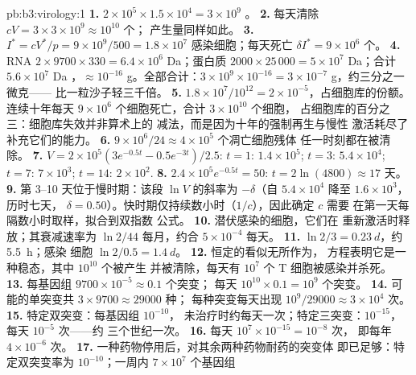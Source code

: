 \begin{solution}{pb:b3:virology:1}
\textbf{1.} $2\times 10^{5}\times 1.5\times 10^{4} = 3\times 10^{9}$
。
\textbf{2.} 每天清除 $cV = 3\times 3\times 10^{9} \approx 10^{10}$ 个；
产生量同样如此。
\textbf{3.} $I^{*} = cV^{*}/p = 9\times 10^{9}/500 = 1.8\times 10^{7}$
感染细胞；每天死亡 $\delta I^{*} = 9\times 10^{6}$ 个。
\textbf{4.} RNA $2\times 9700\times 330 = 6.4\times 10^{6}$ Da；蛋白质
$2000\times 25\,000 = 5\times 10^{7}$ Da；合计 $5.6\times 10^{7}$ Da
，$\approx 10^{-16}$ g。全部合计：$3\times 10^{9}\times
10^{-16} = 3\times 10^{-7}$ g，约三分之一微克——
比一粒沙子轻三千倍。
\textbf{5.} $1.8\times 10^{7}/10^{12} = 2\times 10^{-5}$，占细胞库的份额。
连续十年每天 $9\times 10^{6}$ 个细胞死亡，合计 $3\times 10^{10}$ 个细胞，
占细胞库的百分之三：细胞库失效并非算术上的
减法，而是因为十年的强制再生与慢性
激活耗尽了补充它们的能力。
\textbf{6.} $9\times 10^{6}/24 \approx 4\times 10^{5}$ 个凋亡细胞残体
任一时刻都在被清除。
\textbf{7.} $V = 2\times 10^{5}(3e^{-0.5t} - 0.5e^{-3t})/2.5$: $t = 1$:
$1.4\times 10^{5}$; $t = 3$: $5.4\times 10^{4}$; $t = 7$: $7\times
10^{3}$; $t = 14$: $2\times 10^{2}$.
\textbf{8.} $2.4\times 10^{5}e^{-0.5t} = 50$: $t = 2\ln(4800) \approx 17$
天。
\textbf{9.} 第 3--10 天位于慢时期：该段 $\ln V$ 的斜率为
$-\delta$（自 $5.4\times 10^{4}$ 降至 $1.6\times 10^{3}$，历时七天，
$\delta = 0.50$）。快时期仅持续数小时（$1/c$），因此确定 $c$ 需要
在第一天每隔数小时取样，拟合到双指数
公式。
\textbf{10.} 潜伏感染的细胞，它们在
重新激活时释放；其衰减速率为 $\ln 2/44$ 每月，约合
$5\times 10^{-4}$ 每天。
\textbf{11.}  $\ln 2/3 = \qty{0.23}{d}$，约 \qty{5.5}{h}；感染
细胞 $\ln 2/0.5 = \qty{1.4}{d}$。
\textbf{12.} 恒定的看似无所作为，
方程表明它是一种稳态，其中 $10^{10}$ 个被产生
并被清除，每天有 $10^{7}$ 个 T 细胞被感染并杀死。
\textbf{13.} 每基因组 $9700\times 10^{-5} \approx 0.1$ 个突变；
每天 $10^{10}\times 0.1 = 10^{9}$ 个突变。
\textbf{14.} 可能的单突变共 $3\times 9700 \approx \num{29000}$ 种；
每种突变每天出现 $10^{9}/\num{29000} \approx 3\times 10^{4}$ 次。
\textbf{15.} 特定双突变：每基因组 $10^{-10}$，
未治疗时约每天一次；特定三突变：$10^{-15}$，每天 $10^{-5}$ 次——约
三个世纪一次。
\textbf{16.} 每天 $10^{7}\times 10^{-15} = 10^{-8}$ 次，
即每年 $4\times 10^{-6}$ 次。
\textbf{17.} 一种药物停用后，对其余两种药物耐药的突变体
即已足够：特定双突变率为 $10^{-10}$；一周内 $7\times 10^{7}$ 个基因组

\end{solution}
